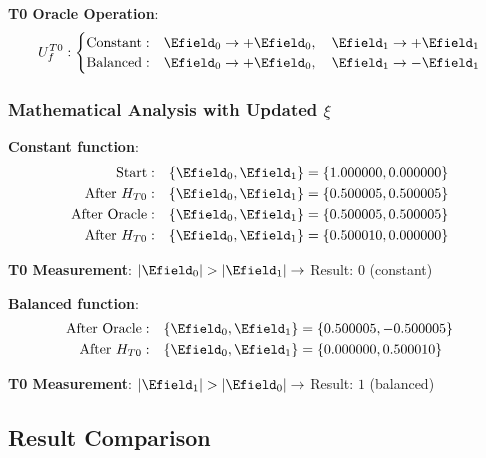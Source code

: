 	\textbf{T0 Oracle Operation}:
	\begin{equation}
		U_f^{T0}: \begin{cases}
			\text{Constant}: & \Efield_0 \rightarrow +\Efield_0, \quad \Efield_1 \rightarrow +\Efield_1 \\
			\text{Balanced}: & \Efield_0 \rightarrow +\Efield_0, \quad \Efield_1 \rightarrow -\Efield_1
		\end{cases}
	\end{equation}
	
	\subsubsection{Mathematical Analysis with Updated $\xi$}
	
	\textbf{Constant function}:
	\begin{align}
		\text{Start}: \quad &\{\Efield_0, \Efield_1\} = \{1.000000, 0.000000\} \\
		\text{After } H_{T0}: \quad &\{\Efield_0, \Efield_1\} = \{0.500005, 0.500005\} \\
		\text{After Oracle}: \quad &\{\Efield_0, \Efield_1\} = \{0.500005, 0.500005\} \\
		\text{After } H_{T0}: \quad &\{\Efield_0, \Efield_1\} = \{0.500010, 0.000000\}
	\end{align}
	
	\textbf{T0 Measurement}: $|\Efield_0| > |\Efield_1| \rightarrow$ Result: $0$ (constant)
	
	\textbf{Balanced function}:
	\begin{align}
		\text{After Oracle}: \quad &\{\Efield_0, \Efield_1\} = \{0.500005, -0.500005\} \\
		\text{After } H_{T0}: \quad &\{\Efield_0, \Efield_1\} = \{0.000000, 0.500010\}
	\end{align}
	
	\textbf{T0 Measurement}: $|\Efield_1| > |\Efield_0| \rightarrow$ Result: $1$ (balanced)
	
	\subsection{Result Comparison}
	
	\begin{table}[htbp]
		\centering
		\caption{Deutsch Algorithm: Perfect Result Agreement with Updated $\xi$}
	\end{table}
	
